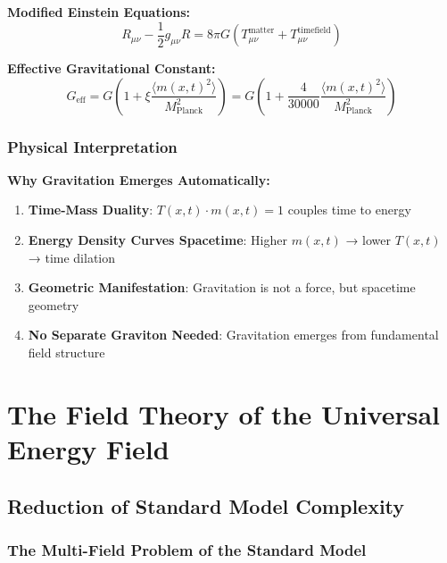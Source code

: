 \documentclass[12pt,a4paper]{report}
\newcommand{\Tfield}{T(x,t)}  %
\newcommand{\mfield}{m(x,t)}  %
\newcommand{\xipar}{\xi}      %
\begin{document}
\textbf{Modified Einstein Equations:}
\begin{equation}\label{eq:einstein_timefield_modified}
	R_{\mu\nu} - \frac{1}{2} g_{\mu\nu} R = 8\pi G \left(T_{\mu\nu}^{\text{matter}} + T_{\mu\nu}^{\text{timefield}}\right)
\end{equation}

\textbf{Effective Gravitational Constant:}
\begin{equation}
	G_{\text{eff}} = G \left(1 + \xipar \frac{\langle \mfield^2 \rangle}{M_{\text{Planck}}^2}\right) = G \left(1 + \frac{4}{30000} \frac{\langle \mfield^2 \rangle}{M_{\text{Planck}}^2}\right)
\end{equation}

\subsection{Physical Interpretation}\label{subsec:gravity_interpretation}

\textbf{Why Gravitation Emerges Automatically:}
\begin{enumerate}
	\item \textbf{Time-Mass Duality}: $\Tfield \cdot \mfield = 1$ couples time to energy
	\item \textbf{Energy Density Curves Spacetime}: Higher $\mfield$ → lower $\Tfield$ → time dilation
	\item \textbf{Geometric Manifestation}: Gravitation is not a force, but spacetime geometry
	\item \textbf{No Separate Graviton Needed}: Gravitation emerges from fundamental field structure
\end{enumerate}	
	\chapter{The Field Theory of the Universal Energy Field}\label{chap:universal_field_theory}
	
	\section{Reduction of Standard Model Complexity}\label{sec:sm_complexity}
	
	\subsection{The Multi-Field Problem of the Standard Model}\label{subsec:multifield_problem}
	
\end{document}
